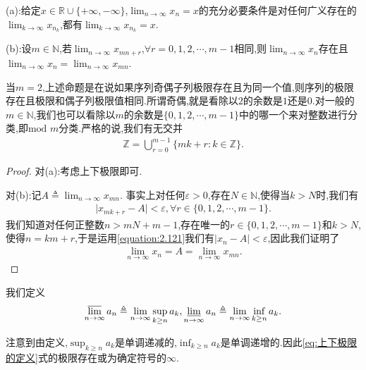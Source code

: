\documentclass[lang=cn,newtx,10pt,scheme=chinese]{elegantbook}
\begin{document}
\begin{proposition}[子列极限命题]\label{proposition:子列极限命题}
(a):给定\(x \in \mathbb{R} \cup \{+\infty, -\infty\}\),\(\lim_{n \to \infty} x_n = x\)的充分必要条件是对任何广义存在的\(\lim_{k \to \infty} x_{n_k}\),都有\(\lim_{k \to \infty} x_{n_k} = x\).

(b):设\(m \in \mathbb{N}\),若\(\lim_{n \to \infty} x_{mn + r}\),\(\forall r = 0,1,2,\cdots,m - 1\)相同,则\(\lim_{n \to \infty} x_n\)存在且
\(\lim_{n \to \infty} x_n = \lim_{n \to \infty} x_{mn}\).
\end{proposition}
\begin{note}
当\(m = 2\),上述命题是在说如果序列奇偶子列极限存在且为同一个值,则序列的极限存在且极限和偶子列极限值相同.所谓奇偶,就是看除以\(2\)的余数是\(1\)还是\(0\).对一般的\(m \in \mathbb{N}\),我们也可以看除以\(m\)的余数是\(\{0,1,2,\cdots,m - 1\}\)中的哪一个来对整数进行分类,即\(\text{mod } m\)分类.严格的说,我们有无交并
\begin{align*}
  \mathbb{Z} = \bigcup_{r = 0}^{m - 1} \{mk + r : k \in \mathbb{Z}\}.
\end{align*}
\end{note}
\begin{proof}
对(a):考虑上下极限即可.

对(b):记\(A \triangleq \lim_{n \to \infty} x_{mn}\).
事实上对任何\(\varepsilon > 0\),存在\(N \in \mathbb{N}\),使得当\(k > N\)时,我们有
\begin{align}\label{equation:2.121}
  \vert x_{mk + r} - A \vert < \varepsilon, \forall r \in \{0,1,2,\cdots,m - 1\}.
\end{align}
我们知道对任何正整数\(n > mN + m - 1\),存在唯一的\(r \in \{0,1,2,\cdots,m - 1\}\)和\(k > N\),使得\(n = km + r\),于是运用\eqref{equation:2.121}我们有\(\vert x_n - A \vert < \varepsilon\),因此我们证明了
\begin{align*}
  \lim_{n \to \infty} x_n = A = \lim_{n \to \infty} x_{mn} .
\end{align*}
\end{proof}

\begin{definition}[上下极限的定义]\label{theorem:上下极限的定义}
我们定义
\begin{align}\label{eq:上下极限的定义}
  \varlimsup_{n \to \infty} a_n \triangleq \lim_{n \to \infty} \sup_{k \geq n} a_k, \varliminf_{n \to \infty} a_n \triangleq \lim_{n \to \infty} \inf_{k \geq n} a_k. 
\end{align}
\end{definition}
\begin{note}
注意到由定义,\(\sup_{k \geq n} a_k\)是单调递减的,\(\inf_{k \geq n} a_k\)是单调递增的.因此\eqref{eq:上下极限的定义}式的极限存在或为确定符号的\(\infty\).
\end{note}
\end{document}
